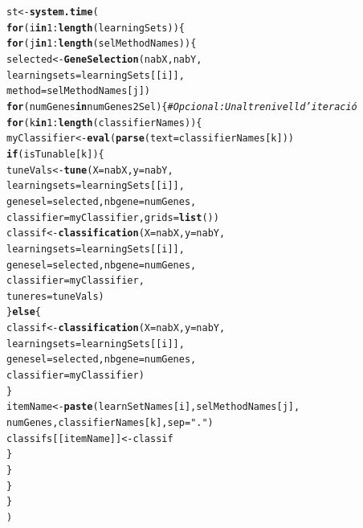\documentclass{article}\usepackage[]{graphicx}\usepackage[]{color}
\makeatletter
\newcommand{\hlnum}[1]{\textcolor[rgb]{0.686,0.059,0.569}{#1}}%
\newcommand{\hlstr}[1]{\textcolor[rgb]{0.192,0.494,0.8}{#1}}%
\newcommand{\hlcom}[1]{\textcolor[rgb]{0.678,0.584,0.686}{\textit{#1}}}%
\newcommand{\hlopt}[1]{\textcolor[rgb]{0,0,0}{#1}}%
\newcommand{\hlstd}[1]{\textcolor[rgb]{0.345,0.345,0.345}{#1}}%
\newcommand{\hlkwa}[1]{\textcolor[rgb]{0.161,0.373,0.58}{\textbf{#1}}}%
\newcommand{\hlkwb}[1]{\textcolor[rgb]{0.69,0.353,0.396}{#1}}%
\newcommand{\hlkwc}[1]{\textcolor[rgb]{0.333,0.667,0.333}{#1}}%
\newcommand{\hlkwd}[1]{\textcolor[rgb]{0.737,0.353,0.396}{\textbf{#1}}}%
\newenvironment{kframe}{%
 \def\at@end@of@kframe{}%
 \ifinner\ifhmode%
  \def\at@end@of@kframe{\end{minipage}}%
  \begin{minipage}{\columnwidth}%
 \fi\fi%
 \def\FrameCommand##1{\hskip\@totalleftmargin \hskip-\fboxsep
 \colorbox{shadecolor}{##1}\hskip-\fboxsep
     \hskip-\linewidth \hskip-\@totalleftmargin \hskip\columnwidth}%
 \MakeFramed {\advance\hsize-\width
   \@totalleftmargin\z@ \linewidth\hsize
   \@setminipage}}%
 {\par\unskip\endMakeFramed%
 \at@end@of@kframe}
\newenvironment{knitrout}{}{} %
\makeatother
\begin{document}
\begin{knitrout}
\begin{kframe}
\begin{alltt}
\hlstd{st} \hlkwb{<-} \hlkwd{system.time}\hlstd{(}
\hlkwa{for} \hlstd{(i} \hlkwa{in} \hlnum{1}\hlopt{:}\hlkwd{length}\hlstd{(learningSets))\{}
  \hlkwa{for} \hlstd{(j} \hlkwa{in} \hlnum{1}\hlopt{:}\hlkwd{length}\hlstd{(selMethodNames))\{}
      \hlstd{selected}  \hlkwb{<-} \hlkwd{GeneSelection}\hlstd{(nabX, nabY,}
                                 \hlkwc{learningsets} \hlstd{= learningSets[[i]],}
                                 \hlkwc{method} \hlstd{= selMethodNames[j])}
      \hlkwa{for} \hlstd{(numGenes} \hlkwa{in} \hlstd{numGenes2Sel)\{} \hlcom{# Opcional : Un altre nivell d'iteració}
        \hlkwa{for} \hlstd{(k} \hlkwa{in} \hlnum{1}\hlopt{:}\hlkwd{length}\hlstd{(classifierNames))\{}
          \hlstd{myClassifier} \hlkwb{<-} \hlkwd{eval}\hlstd{(}\hlkwd{parse}\hlstd{(}\hlkwc{text}\hlstd{=classifierNames[k]))}
          \hlkwa{if}\hlstd{(isTunable[k])\{}
               \hlstd{tuneVals} \hlkwb{<-} \hlkwd{tune} \hlstd{(}\hlkwc{X}\hlstd{=nabX,} \hlkwc{y}\hlstd{=nabY,}
                                 \hlkwc{learningsets}\hlstd{= learningSets[[i]],}
                                 \hlkwc{genesel}\hlstd{=selected,} \hlkwc{nbgene}\hlstd{=numGenes,}
                                \hlkwc{classifier} \hlstd{=myClassifier,}  \hlkwc{grids}\hlstd{=}\hlkwd{list}\hlstd{())}
               \hlstd{classif} \hlkwb{<-} \hlkwd{classification}\hlstd{(}\hlkwc{X} \hlstd{= nabX,} \hlkwc{y}\hlstd{=nabY,}
                                         \hlkwc{learningsets} \hlstd{= learningSets[[i]],}
                                         \hlkwc{genesel}\hlstd{=selected,} \hlkwc{nbgene}\hlstd{=numGenes,}
                                         \hlkwc{classifier}\hlstd{=myClassifier,}
                                         \hlkwc{tuneres}\hlstd{=tuneVals)}
             \hlstd{\}}\hlkwa{else}\hlstd{\{}
               \hlstd{classif} \hlkwb{<-} \hlkwd{classification}\hlstd{(}\hlkwc{X} \hlstd{= nabX,} \hlkwc{y}\hlstd{=nabY,}
                                         \hlkwc{learningsets} \hlstd{= learningSets[[i]],}
                                         \hlkwc{genesel}\hlstd{=selected,} \hlkwc{nbgene}\hlstd{=numGenes,}
                                         \hlkwc{classifier}\hlstd{=myClassifier)}
             \hlstd{\}}
          \hlstd{itemName}\hlkwb{<-} \hlkwd{paste}\hlstd{(learnSetNames[i], selMethodNames[j],}
                           \hlstd{numGenes, classifierNames[k],} \hlkwc{sep}\hlstd{=}\hlstr{"."}\hlstd{)}
          \hlstd{classifs[[itemName]]}\hlkwb{<-} \hlstd{classif}
        \hlstd{\}}
      \hlstd{\}}
    \hlstd{\}}
\hlstd{\}}
\hlstd{)}
\end{alltt}



\end{kframe}
\end{knitrout}
\end{document}
